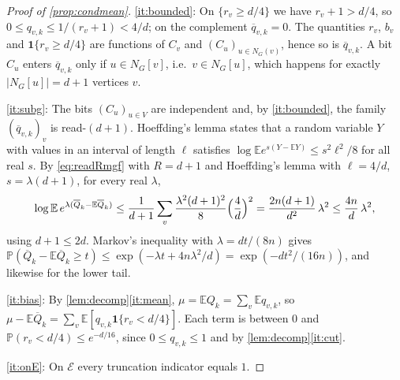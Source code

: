 \documentclass[11pt,a4paper]{article}
\theoremstyle{plain}
\theoremstyle{definition}
\theoremstyle{remark}
\newcommand{\EE}{\mathbb E}
\newcommand{\PP}{\mathbb P}
\newcommand{\ind}{\mathbf 1}
\newcommand{\cE}{\mathcal E}
\newcommand{\Qbar}{\overline Q}
\newcommand{\qbar}{\overline q}
\begin{document}
\label{pf:condmean}
\begin{proof}[Proof of \cref{prop:condmean}]
\ref{it:bounded}: On $\{r_v\ge d/4\}$ we have $r_v+1>d/4$, so $0\le q_{v,k}\le1/(r_v+1)<4/d$; on the complement $\qbar_{v,k}=0$. The quantities $r_v$, $b_v$ and $\ind\{r_v\ge d/4\}$ are functions of $C_v$ and $(C_u)_{u\in N_G(v)}$, hence so is $\qbar_{v,k}$. A bit $C_u$ enters $\qbar_{v,k}$ only if $u\in N_G[v]$, i.e.\ $v\in N_G[u]$, which happens for exactly $|N_G[u]|=d+1$ vertices $v$.

\ref{it:subg}: The bits $(C_u)_{u\in V}$ are independent and, by \ref{it:bounded}, the family $(\qbar_{v,k})_v$ is read-$(d+1)$. Hoeffding's lemma \cite{Hoeffding63} states that a random variable $Y$ with values in an interval of length $\ell$ satisfies $\log\EE e^{s(Y-\EE Y)}\le s^2\ell^2/8$ for all real $s$. By \eqref{eq:readRmgf} with $R=d+1$ and Hoeffding's lemma with $\ell=4/d$, $s=\lambda(d+1)$, for every real $\lambda$,
\[
 \log\EE\, e^{\lambda(\Qbar_k-\EE\Qbar_k)}\le\frac1{d+1}\sum_v\frac{\lambda^2(d+1)^2}{8}\Bigl(\frac4d\Bigr)^2=\frac{2n(d+1)}{d^2}\,\lambda^2\le\frac{4n}d\,\lambda^2 ,
\]
using $d+1\le2d$. Markov's inequality with $\lambda=dt/(8n)$ gives $\PP(\Qbar_k-\EE\Qbar_k\ge t)\le\exp(-\lambda t+4n\lambda^2/d)=\exp(-dt^2/(16n))$, and likewise for the lower tail.

\ref{it:bias}: By \cref{lem:decomp}\ref{it:mean}, $\mu=\EE Q_k=\sum_v\EE q_{v,k}$, so $\mu-\EE\Qbar_k=\sum_v\EE[q_{v,k}\ind\{r_v<d/4\}]$. Each term is between $0$ and $\PP(r_v<d/4)\le e^{-d/16}$, since $0\le q_{v,k}\le1$ and by \cref{lem:decomp}\ref{it:cut}.

\ref{it:onE}: On $\cE$ every truncation indicator equals $1$.
\end{proof}
\end{document}
